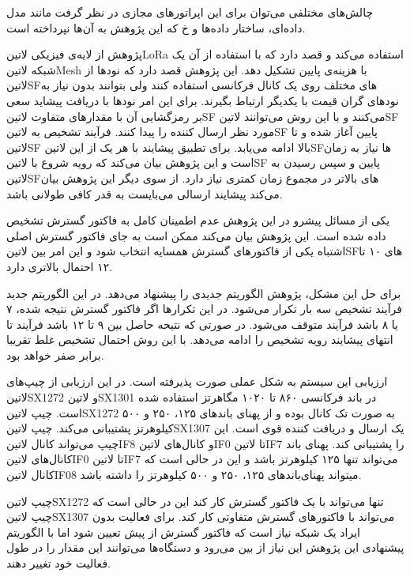 چالش‌های مختلفی می‌توان برای این اپراتورهای مجازی در نظر گرفت مانند مدل داده‌ای، ساختار داده‌ها و ‌خ که این پژوهش به آن‌ها نپرداخته است.


پژوهش  از لایه‌ی فیزیکی ‌لاتین{LoRa} استفاده می‌کند و قصد دارد که با استفاده از آن یک شبکه ‌لاتین{Mesh} با هزینه‌ی پایین تشکیل دهد.
این پژوهش قصد دارد که نودها از ‌لاتین{SF}های مختلف روی یک کانال فرکانسی استفاده کنند ولی بتوانند بدون نیاز به نودهای گران قیمت با یکدیگر ارتباط بگیرند.
برای این امر نودها با دریافت پیشاید سعی بر رمزگشایی آن با مقدارهای متفاوت ‌لاتین{SF} می‌کنند و با این روش می‌توانند ‌لاتین{SF} مورد نظر ارسال کننده را پیدا کنند.
فرآیند تشخیص به ‌لاتین{SF} پایین آغاز شده و تا ‌لاتین{SF} بالا ادامه می‌یابد. برای تطبیق پیشایند با هر یک از این ‌لاتین{SF}ها نیاز به زمان است
و این پژوهش بیان می‌کند که رویه شروع با ‌لاتین{SF} پایین و سپس رسیدن به ‌لاتین{SF}های بالاتر در مجموع زمان کمتری نیاز دارد.
از سوی دیگر این پژوهش بیان می‌کند پیشایند ارسالی می‌بایست به قدر کافی طولانی باشد.

یکی از مسائل پیشرو در این پژوهش عدم اطمینان کامل به فاکتور گسترش تشخیص داده شده است.
این پژوهش بیان می‌کند ممکن است به جای فاکتور گسترش اصلی اشتباه یکی از فاکتورهای گسترش همسایه انتخاب شود و
این امر بین ‌لاتین{SF}های ۱۰ تا ۱۲ احتمال بالاتری دارد.

برای حل این مشکل، پژوهش الگوریتم جدیدی را پیشنهاد می‌دهد. در این الگوریتم جدید فرآیند تشخیص سه بار تکرار می‌شود.
در این تکرارها اگر فاکتور گسترش نتیجه شده، ۷ یا ۸ باشد فرآیند متوقف می‌شود.
در صورتی که نتیحه حاصل بین ۹ تا ۱۲ باشد فرآیند تا انتهای پیشایند رویه تشخیص را ادامه می‌دهد.
با این روش احتمال تشخیص غلط تقریبا برابر صفر خواهد بود.

ارزیابی این سیستم به شکل عملی صورت پذیرفته است. در این ارزیابی از چیپ‌های ‌لاتین{SX1272} و ‌لاتین{SX1301} در باند فرکانسی ۸۶۰ تا ۱۰۲۰ مگاهرتز استفاده شده است.
چیپ ‌لاتین{SX1272} به صورت تک کانال بوده و از پهنای باندهای ۱۲۵، ۲۵۰ و ۵۰۰ کیلوهرتز پشتیبانی می‌کند.
چیپ ‌لاتین{SX1307} یک ارسال و دریافت کننده قوی است. این چیپ می‌تواند کانال ‌لاتین{IF8} و کانال‌های ‌لاتین{IF0} تا ‌لاتین{IF7} را پشتیبانی کند.
پهنای باند کانال‌های ‌لاتین{IF0} تا ‌لاتین{IF7} می‌تواند تنها ۱۲۵ کیلوهرتز باشد و این در حالی است که کانال ‌لاتین{IF08} میتواند پهنای‌باندهای ۱۲۵، ۲۵۰ و ۵۰۰ کیلوهرتز را داشته باشد.

چیپ ‌لاتین{SX1272} تنها می‌تواند با یک فاکتور گسترش کار کند این در حالی است که چیپ ‌لاتین{SX1307} می‌تواند با فاکتورهای گسترش متفاوتی کار کند.
برای فعالیت بدون ایراد یک شبکه نیاز است که فاکتور گسترش از پیش تعیین شود اما با الگوریتم پیشنهادی این پژوهش این نیاز از بین می‌رود و دستگاه‌ها می‌توانند
این مقدار را در طول فعالیت خود تغییر دهند.

